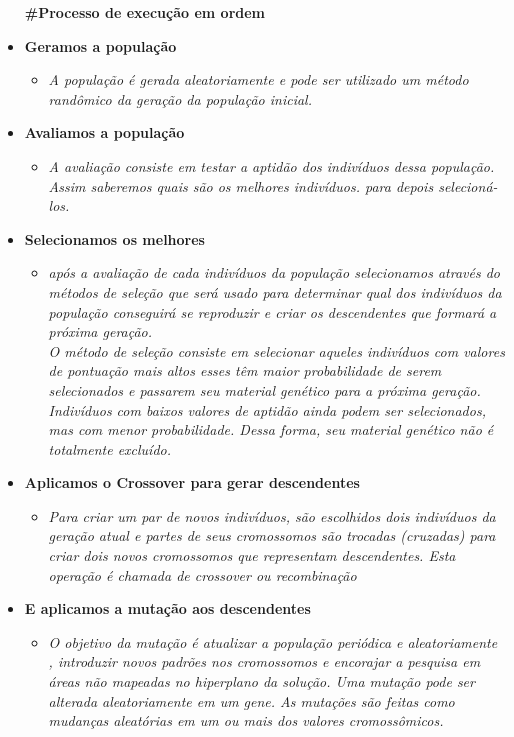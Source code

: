 \begin{itemize}
\begin{center}
    \textbf{#Processo de execução em ordem}
\end{center}
\item {\textbf{Geramos a população}}
\begin{itemize}
    \item \emph{A população é gerada aleatoriamente e pode ser utilizado um método randômico da geração da população inicial.\\}
\end{itemize}

\item {\bfseries Avaliamos a população}
\begin{itemize}
    \item \emph{A avaliação consiste em testar a aptidão dos indivíduos dessa população.
Assim saberemos quais são os melhores indivíduos.
para depois selecioná-los.
}
\end{itemize}
\item {\bfseries Selecionamos os melhores}
\begin{itemize}
    \item \emph{após a avaliação de cada indivíduos da população selecionamos através do métodos de seleção que será usado para determinar qual dos indivíduos da população conseguirá se reproduzir e criar os descendentes que formará a próxima geração.\\ O método de seleção consiste em selecionar aqueles indivíduos com valores de pontuação mais altos esses têm maior probabilidade de serem selecionados e passarem seu material genético para a próxima geração. Indivíduos com baixos valores de aptidão ainda podem ser selecionados, mas com menor probabilidade. Dessa forma, seu material genético não é totalmente excluído.}\\
\end{itemize}
\item {\bfseries Aplicamos o Crossover para gerar descendentes}
\begin{itemize}
    \item \emph{Para criar um par de novos indivíduos, são escolhidos dois indivíduos da geração atual e partes de seus cromossomos são trocadas (cruzadas) para criar dois novos cromossomos que representam descendentes. Esta operação é chamada de crossover ou recombinação}\\
\end{itemize}
\item {\bfseries E aplicamos a mutação aos descendentes}
\begin{itemize}
    \item \emph{O objetivo da mutação é atualizar a população periódica e aleatoriamente , introduzir novos padrões nos cromossomos e encorajar a pesquisa em áreas não mapeadas no hiperplano da solução.
Uma mutação pode ser alterada aleatoriamente em um gene. As mutações são feitas como mudanças aleatórias em um ou mais dos valores cromossômicos.
}\\
\end{itemize}
\end{itemize}
